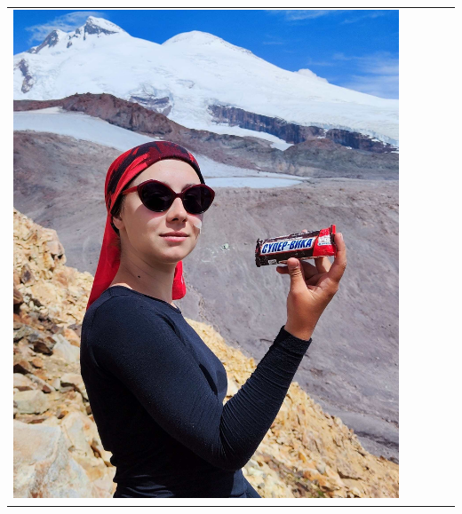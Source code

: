 \documentclass[
11pt, %
]{beamer}
\newcommand\rozhasize{0.17\textwidth}
\begin{document}
\begin{frame}
\begin{tabular}{ccccc}
	\hline
	\begin{minipage}{\rozhasize}
	\includegraphics[width=\textwidth]{../pics/portraits/vika}
	\end{minipage} &
	\begin{minipage}{\rozhasize}

\end{minipage}
\end{tabular}
\end{frame}
\end{document}
